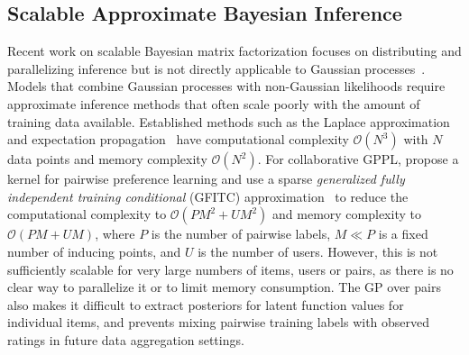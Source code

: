 \subsection{Scalable Approximate Bayesian Inference}

Recent work on scalable Bayesian matrix factorization focuses on distributing and parallelizing 
 inference %
 but is not directly applicable to Gaussian processes~\citep{ahn2015large,vander2017distributed,chen2018large}. 
Models that combine Gaussian processes with non-Gaussian likelihoods 
require approximate inference methods that often scale poorly with 
the amount of training data available. 
Established methods such as the Laplace approximation 
and expectation propagation~\citep{rasmussen_gaussian_2006} have
computational complexity $\mathcal{O}(N^3)$ with $N$ data points
 and memory complexity $\mathcal{O}(N^2)$. 
For collaborative GPPL, \citet{houlsby2012collaborative}
propose a  kernel for pairwise 
preference learning and use a sparse
\emph{generalized fully independent training conditional} (GFITC) 
approximation~\citep{snelson2006sparse} to reduce the computational complexity to $\mathcal{O}(PM^2 + UM^2)$ and 
memory complexity to $\mathcal{O}(PM + UM)$,
where $P$ is the number of pairwise labels, $M \ll P$ is a fixed number of inducing points, and $U$ is the number of users.
However, this is not sufficiently scalable
 for very large numbers of items, users or pairs, as there is no clear way to parallelize it or to limit memory consumption.
The GP over pairs also makes it difficult to extract posteriors for latent function values for individual items,
and prevents mixing pairwise training labels
with observed ratings in future data aggregation settings.

